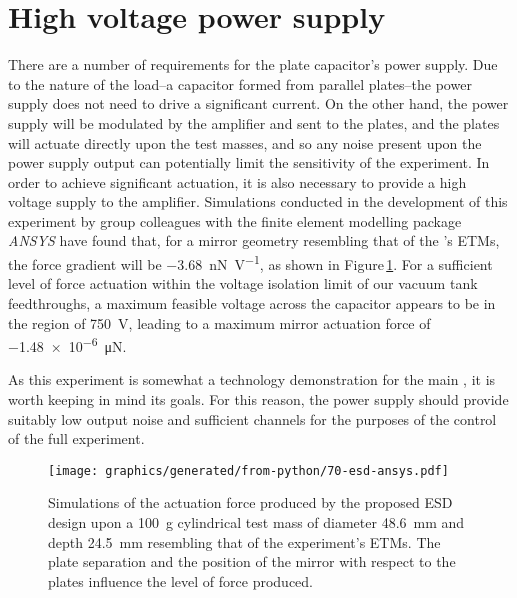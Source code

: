 \section{High voltage power supply}

\newcommand{\ESDFORCEGRAD}{\SI{-3.68}{\nano\newton\per\volt}}

\newcommand{\ESDMAXVOLTAGE}{\SI{750}{\volt}}

\newcommand{\ESDMAXFORCE}{\SI{-1.48e-6}{\micro\newton}}

There are a number of requirements for the plate capacitor's power supply. Due to the nature of the load--a capacitor formed from parallel plates--the power supply does not need to drive a significant current. On the other hand, the power supply will be modulated by the amplifier and sent to the plates, and the plates will actuate directly upon the test masses, and so any noise present upon the power supply output can potentially limit the sensitivity of the experiment. In order to achieve significant actuation, it is also necessary to provide a high voltage supply to the amplifier. Simulations conducted in the development of this experiment by group colleagues with the finite element modelling package \emph{ANSYS} have found that, for a mirror geometry resembling that of the \SSMEXPT{}'s ETMs, the force gradient will be \ESDFORCEGRAD{}, as shown in Figure\,\ref{fig:esd-ansys}. For a sufficient level of force actuation within the voltage isolation limit of our vacuum tank feedthroughs, a maximum feasible voltage across the capacitor appears to be in the region of \ESDMAXVOLTAGE{}, leading to a maximum mirror actuation force of \ESDMAXFORCE{}.

As this experiment is somewhat a technology demonstration for the main \SSMEXPT{}, it is worth keeping in mind its goals. For this reason, the power supply should provide suitably low output noise and sufficient channels for the purposes of the control of the full experiment.

\begin{figure}
  \centering
  \texttt{[image: graphics/generated/from-python/70-esd-ansys.pdf]}
  \caption{Simulations of the actuation force produced by the proposed \gls{ESD} design upon a \SI{100}{\gram} cylindrical test mass of diameter \SI{48.6}{\milli\meter} and depth \SI{24.5}{\milli\meter} resembling that of the \SSM experiment's ETMs. The plate separation and the position of the mirror with respect to the plates influence the level of force produced. }
  \label{fig:esd-ansys}
\end{figure}

